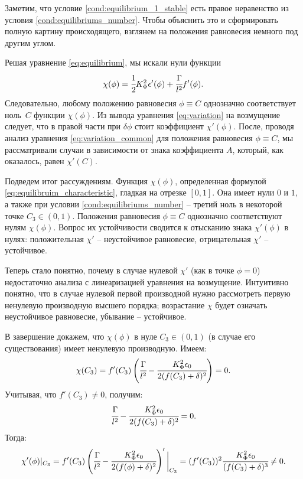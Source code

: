 Заметим, что условие \eqref{cond:equilibrium_1_stable} есть правое неравенство из условия \eqref{cond:equilibriums_number}. Чтобы объяснить это и сформировать полную картину происходящего, взглянем на положения равновесия немного под другим углом.

Решая уравнение \eqref{eq:equilibrium}, мы искали нули функции 
\begin{equation}
	\chi(\phi) = \cfrac{1}{2} K_\Phi^2 \epsilon'(\phi) + \cfrac{\Gamma}{l^2} f'(\phi) {\text{.}}
	\label{eq:equilibruim_characteristic}
\end{equation}
Следовательно, любому положению равновесия $\phi \equiv C$ однозначно соответствует ноль~$C$ функции $\chi(\phi)$. Из вывода уравнения \eqref{eq:variation} на возмущение следует, что в правой части при $\delta \phi$ стоит коэффициент $\chi'(\phi)$. После, проводя анализ уравнения \eqref{eq:variation_common} для положения равновесия $\phi \equiv C$, мы рассматривали случаи в зависимости от знака коэффициента $A$, который, как оказалось, равен $\chi'(C)$.

Подведем итог рассуждениям. Функция $\chi(\phi)$, определенная формулой \eqref{eq:equilibruim_characteristic}, гладкая на отрезке $[0, 1]$. Она имеет нули $0$ и $1$, а также при условии \eqref{cond:equilibriums_number} -- третий ноль в некоторой точке $C_3 \in (0, 1)$. Положения равновесия $\phi \equiv C$ однозначно соответствуют нулям $\chi(\phi)$. Вопрос их устойчивости сводится к отысканию знака $\chi'(\phi)$ в нулях: положительная $\chi'$ -- неустойчивое равновесие, отрицательная $\chi'$ -- устойчивое.

Теперь стало понятно, почему в случае нулевой $\chi'$ (как в точке $\phi = 0$) недостаточно анализа с линеаризацией уравнения на возмущение. Интуитивно понятно, что в случае нулевой первой производной нужно рассмотреть первую ненулевую производную высшего порядка; возрастание $\chi$ будет означать неустойчивое равновесие, убывание -- устойчивое.

В завершение докажем, что $\chi(\phi)$ в нуле $C_3 \in (0, 1)$ (в случае его существования) имеет ненулевую производную. Имеем:
$$\chi(C_3) = f'(C_3) \left( \cfrac{\Gamma}{l^2} - \cfrac{K_\Phi^2 \epsilon_0}{2 (f(C_3) + \delta)^2} \right) = 0 {\text{.}}$$
Учитывая, что $f'(C_3) \ne 0$, получим:
$$\cfrac{\Gamma}{l^2} - \cfrac{K_\Phi^2 \epsilon_0}{2 (f(C_3) + \delta)^2} = 0 {\text{.}}$$
Тогда:
$$\chi'(\phi)|_{C_3} = f'(C_3) \left( \cfrac{\Gamma}{l^2} - \cfrac{K_\Phi^2 \epsilon_0}{2 (f(\phi) + \delta)^2} \right) ' \bigg|_{C_3} = (f'(C_3))^2 \cfrac{K_\Phi^2 \epsilon_0}{(f(C_3) + \delta)^3} \ne 0 \text{.}$$

